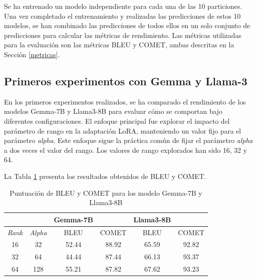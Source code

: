 \documentclass[11pt,spanish,listoffigures,listoftables]{tfgetsinf}
\begin{document}
Se ha entrenado un modelo independiente para cada una de las 10 particiones. Una vez completado el entrenamiento y realizadas las predicciones de estos 10 modelos, se han combinado las predicciones de todos ellos en un solo conjunto de predicciones para calcular las métricas de rendimiento. Las métricas utilizadas para la evaluación son las métricas BLEU y COMET, ambas descritas en la Sección \ref{metricas}.

\subsection{Primeros experimentos con Gemma y Llama-3}

En los primeros experimentos realizados, se ha comparado el rendimiento de los modelos Gemma-7B y Llama3-8B para evaluar cómo se comportan bajo diferentes configuraciones. El enfoque principal fue explorar el impacto del parámetro de rango en la adaptación LoRA, manteniendo un valor fijo para el parámetro \textit{alpha}. Este enfoque sigue la práctica común de fijar el parámetro \textit{alpha} a dos veces el valor del rango. Los valores de rango explorados han sido 16, 32 y 64.

La Tabla \ref{tab: Gemma y Llama} presenta los resultados obtenidos de BLEU y COMET.

\begin{table}[!h]
\caption{Puntuación de BLEU y COMET para los modelo Gemma-7B y Llama3-8B}
\begin{center}
\begin{tabular}{ c c c c c c }
	\ & \ & Gemma-7B & \ & Llama3-8B & \ \\
	\hline
	\textit{Rank} & \textit{Alpha} & BLEU & COMET & BLEU & COMET \\
	\hline
	\hline
	16 & 32 & 52.44 & 88.92 & 65.59 & 92.82 \\
	\hline
	32 & 64 & 44.44 & 87.44 & 66.13 & 93.37 \\
	\hline
	64 & 128 & 55.21 & 87.82 & 67.62 & 93.23 \\
	

\end{tabular}
\end{center}
\label{tab: Gemma y Llama}
\end{table}
\end{document}

